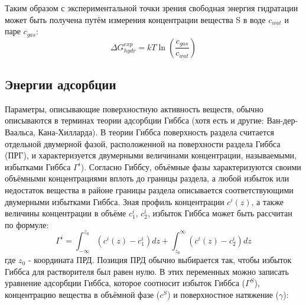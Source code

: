 Таким образом с экспериментальной точки зрения свободная энергия гидратации может быть получена путём измерения концентрации вещества S в воде $c_{wat}$ и паре $c_{gas}$:
\begin{equation}
\Delta G_{hydr}^{exp}=kT\ln\left(\frac{c_{gas}}{c_{wat}}\right)
\label{hydr_energy_exp}
\end{equation}


\subsection{\label{ads_fe_theory}Энергии адсорбции}
Параметры, описывающие поверхностную активность веществ, обычно описываются в терминах теории адсорбции Гиббса (хотя есть и другие: Ван-дер-Ваальса, Кана-Хилларда). В теории Гиббса \cite{gibbs_ads_theory} поверхность раздела считается отдельной двумерной фазой, расположенной на поверхности раздела Гиббса (ПРГ), и характеризуется двумерными величинами концентрации, называемыми, избытками Гиббса $\Gamma^i$). Согласно Гиббсу, объёмные фазы характеризуются своими объёмными концентрациями вплоть до границы раздела, а любой избыток или недостаток вещества в районе границы раздела описывается соответствующими двумерными избытками Гиббса.
Зная профиль концентрации $c^i(z)$, а также величины концентрации в объёме $c^i_1$, $c^i_2$, избыток Гиббса может быть рассчитан по формуле:
\begin{equation}
\Gamma^i=\int_{-\infty}^{z_0}(c^i(z)-c^i_1)dz+\int_{z_0}^{\infty}(c^i(z)-c^i_2)dz
\label{excess}
\end{equation}
где $z_0$ - координата ПРД. Позиция ПРД обычно выбирается так, чтобы избыток Гиббса для растворителя был равен нулю.
В этих переменных можно записать уравнение адсорбции Гиббса, которое соотносит избыток Гиббса ($\Gamma^S$), концентрацию вещества в объёмной фазе ($c^S$) и поверхностное натяжение ($\gamma$):

